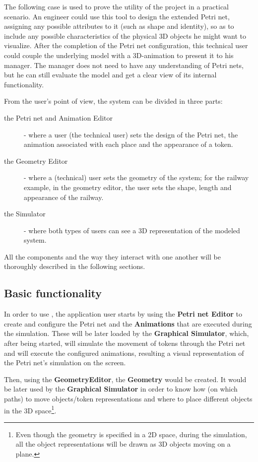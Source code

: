 The following case is used to prove the utility of the project in a practical scenario. An engineer
could use this tool to design the extended Petri net, assigning any possible attributes to it (such
as shape and identity), so as to include any possible characteristics of the physical 3D objects he
might want to visualize. After the completion of the Petri net configuration, this technical user
could couple the underlying model with a 3D-animation to present it to his manager. The manager does
not need to have any understanding of Petri nets, but he can still evaluate the model and get a
clear view of its internal functionality.

From the user's point of view, the system can be divided in three parts:

\begin{description}
	\item[the Petri net and Animation Editor] - where a user (the technical user)
	sets the design of the Petri net, the animation associated with each place and
	the appearance of a token.
	\item[the Geometry Editor] - where a (technical) user sets the geometry of the
	system; for the railway example, in the geometry editor, the user sets the
	shape, length and appearance of the railway.
	\item[the Simulator] - where both types of users can see a 3D representation
	of the modeled system.
\end{description}

All the components and the way they interact with one another will be thoroughly described in the
following sections.

\subsection{Basic functionality}
In order to use \epns, the application user starts by using the \textbf{Petri net Editor} to create
and configure the Petri net and the \textbf{Animations} that are executed during the simulation.
These will be later loaded by the \textbf{Graphical Simulator}, which, after being started, will
simulate the movement of tokens through the Petri net and will execute the configured animations,
resulting a visual representation of the Petri net's simulation on the screen.

Then, using the \textbf{GeometryEditor}, the \textbf{Geometry} would be created. It would be later
used by the \textbf{Graphical Simulator} in order to know how (on which paths) to move objects/token
representations and where to place different objects in the 3D space\footnote{Even though the
geometry is specified in a 2D space, during the simulation, all the object representations will be
drawn as 3D objects moving on a plane.}.

